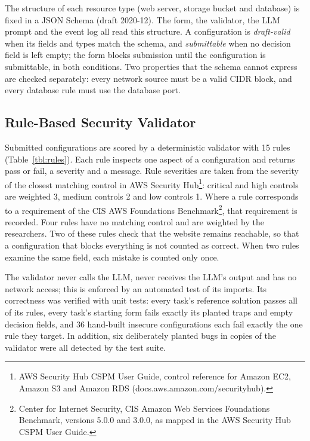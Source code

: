 The structure of each resource type (web server, storage bucket and database) is fixed in a JSON Schema (draft 2020-12). The form, the validator, the LLM prompt and the event log all read this structure. A configuration is \emph{draft-valid} when its fields and types match the schema, and \emph{submittable} when no decision field is left empty; the form blocks submission until the configuration is submittable, in both conditions. Two properties that the schema cannot express are checked separately: every network source must be a valid CIDR block, and every database rule must use the database port.

\subsection{Rule-Based Security Validator}

Submitted configurations are scored by a deterministic validator with 15 rules (Table~\ref{tbl:rules}). Each rule inspects one aspect of a configuration and returns pass or fail, a severity and a message. Rule severities are taken from the severity of the closest matching control in AWS Security Hub\footnote{AWS Security Hub CSPM User Guide, control reference for Amazon EC2, Amazon S3 and Amazon RDS (docs.aws.amazon.com/securityhub).}: critical and high controls are weighted 3, medium controls 2 and low controls 1. Where a rule corresponds to a requirement of the CIS AWS Foundations Benchmark\footnote{Center for Internet Security, CIS Amazon Web Services Foundations Benchmark, versions 5.0.0 and 3.0.0, as mapped in the AWS Security Hub CSPM User Guide.}, that requirement is recorded. Four rules have no matching control and are weighted by the researchers. Two of these rules check that the website remains reachable, so that a configuration that blocks everything is not counted as correct. When two rules examine the same field, each mistake is counted only once.

The validator never calls the LLM, never receives the LLM's output and has no network access; this is enforced by an automated test of its imports. Its correctness was verified with unit tests: every task's reference solution passes all of its rules, every task's starting form fails exactly its planted traps and empty decision fields, and 36 hand-built insecure configurations each fail exactly the one rule they target. In addition, six deliberately planted bugs in copies of the validator were all detected by the test suite.

